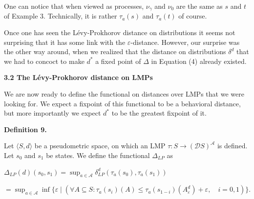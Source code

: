 One can notice that when viewed as processes, $\nu_{\gamma}$ and $\nu_{0}$ are the same as $s$ and $t$ of Example 3. Technically, it is rather $\tau_{a}(s)$ and $\tau_{a}(t)$ of course.\par
 
 
 
Once one has seen the Lévy-Prokhorov distance on distributions it seems not surprising that it has some link with the $\varepsilon$-distance. However, our surprise was the other way around, when we realized that the distance on distributions $\delta^{d}$ that we had to concoct to make $d^{*}$ a fixed point of $\Delta$ in Equation (4) already existed.\par
 
 
 
 
\par\medskip\noindent\textbf{3.2 The Lévy-Prokhorov distance on LMPs}\par
 
 
We are now ready to define the functional on distances over LMPs that we were looking for. We expect a fixpoint of this functional to be a behavioral distance, but more importantly we expect $d^{*}$ to be the greatest fixpoint of it.\par
 
 
 
\par\medskip\noindent\textbf{Definition 9.}\par
 
 
Let $\langle S,d\rangle$ be a pseudometric space, on which an LMP $\tau:S\to(\mathcal{D}S)^{\mathcal{A}}$ is defined. Let $s_{0}$ and $s_{1}$ be states. We define the functional $\Delta_{LP}$ as\par
  
\par  \quad  $\displaystyle\Delta_{LP}(d)(s_{0},s_{1})$\quad  $\displaystyle=\sup_{a\in\mathcal{A}}\delta_{LP}^{d}(\tau_{a}(s_{0}),\tau_{a}(s_{1}))$\quad  \quad  
 
\par  \quad  \quad  $\displaystyle=\sup_{a\in\mathcal{A}}\inf\{\varepsilon\mid(\forall A\subseteq S:\tau_{a}(s_{i})(A)\leq\tau_{a}(s_{1-i})(A^{d}_{\varepsilon})+\varepsilon,\quad i=0,1)\}.$\quad  \quad  
  
